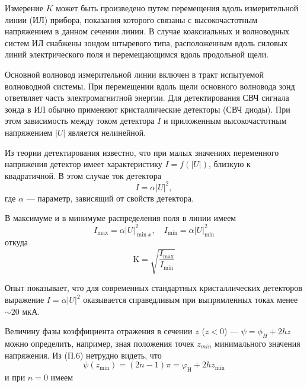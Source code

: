 Измерение $K$ может быть произведено путем перемещения вдоль измерительной линии (ИЛ) прибора, показания которого связаны с высокочастотным напряжением в данном сечении линии. 
В случае коаксиальных и волноводных систем ИЛ снабжены зондом штыревого типа, расположенным вдоль силовых линий электрического поля и перемещающимся вдоль продольной щели. 

Основной волновод измерительной линии включен в тракт испытуемой волноводной системы. 
При перемещении вдоль щели основного волновода зонд ответвляет часть электромагнитной энергии. 
Для детектирования СВЧ сигнала зонда в ИЛ обычно применяют кристаллические детекторы (СВЧ диоды). 
При этом зависимость между током детектора $I$ и приложенным высокочастотным напряжением $|U|$ является нелинейной.

Из теории детектирования известно, что при малых значениях переменного напряжения детектор имеет характеристику $I=f(|U|)$, близкую к квадратичной. В этом случае ток детектора
\begin{equation}
	I=\alpha|U|^2,
\end{equation}
где $\alpha$ --- параметр, зависящий от свойств детектора.

В максимуме и в минимуме распределения поля в линии имеем
\begin{equation}
	I _ { \max } = \alpha | U | _ { \min x } ^ { 2 } , \quad I _ { \min } = \alpha | U | _ { \min } ^ { 2 }
\end{equation}
откуда
\begin{equation}
	\mathrm { K } = \sqrt { \frac { I _ { \mathrm { max } } } { I _ { \mathrm { min } } } }
\end{equation}

Опыт показывает, что для современных стандартных кристаллических детекторов выражение  $I=\alpha|U|^2$ оказывается справедливым при выпрямленных токах менее $\sim20$ мкА.

Величину фазы коэффициента отражения в сечении $z$ ($z<0$) --- $\psi=\phi_H+2hz$ можно определить, например, зная положения точек $z_{min}$ минимального значения напряжения. Из (П.6) нетрудно видеть, что
\begin{equation}
	\psi \left( z _ { \min } \right) = ( 2 n - 1 ) \pi = \varphi _ { \mathrm { H } } + 2 h z _ { \min }
\end{equation}
и при $n = 0$ имеем

